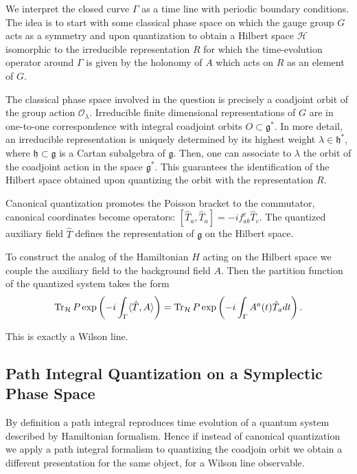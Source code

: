 \documentclass[11pt]{report}
\theoremstyle{plain}
\theoremstyle{definition}
\theoremstyle{remark}
\theoremstyle{remark}
\numberwithin{equation}{section}
\begin{document}
We interpret the closed curve $\Gamma$ as a time line with periodic boundary conditions. 
The idea is to start with some classical phase space on which the gauge group $G$ acts as a symmetry and upon quantization to obtain a Hilbert space $\mathcal{H}$ isomorphic to the irreducible representation $R$ for which the time-evolution operator around $\Gamma$ is given by the holonomy of $A$ which acts on $R$ as an element of $G$.

The classical phase space involved in the question is precisely a coadjoint orbit of the group action $\mathcal{O}_\lambda$. 
Irreducible finite dimensional representations of $G$ are in one-to-one correspondence with integral coadjoint orbits $O \subset \mathfrak{g}^*$. In more detail, an irreducible representation is uniquely determined by its highest weight $\lambda \in \mathfrak{h}^*$, where $\mathfrak{h} \subset \mathfrak{g}$ is a Cartan subalgebra of $\mathfrak{g}$. Then, one can associate to $\lambda$ the orbit of the coadjoint action in the space $\mathfrak{g}^*$. This guarantees the identification of the Hilbert space obtained upon quantizing the orbit with the representation $R$. 

Canonical quantization promotes the Poisson bracket to the commutator, canonical coordinates become operators: $[\hat{T}_a,  \hat{T}_a] = -if_{ab}^c \hat{T}_c$. The quantized auxiliary field $\hat{T}$ defines the representation of $\mathfrak{g}$ on the Hilbert space. 

To construct the analog of the Hamiltonian $H$ acting on the Hilbert space we couple the auxiliary field to the background field $A$. Then the partition function of the quantized system takes the form 
\begin{equation}
{\rm Tr}_{\mathcal{H}} \, P\exp\left( -i\int_\Gamma \langle \hat{T}, A\rangle\right) = {\rm Tr}_{\mathcal{H}} \, P\exp\left( -i\int_\Gamma A^a(t)\hat{T}_a dt\right).
\end{equation}

This is exactly a Wilson line. 



\subsection{Path Integral Quantization on a Symplectic Phase Space}

By definition a path integral reproduces time evolution of a quantum system described by Hamiltonian formalism. Hence if instead of canonical quantization we apply a path integral formalism to quantizing the coadjoin orbit we obtain a different presentation for the same object, for a Wilson line observable. 
\end{document}
